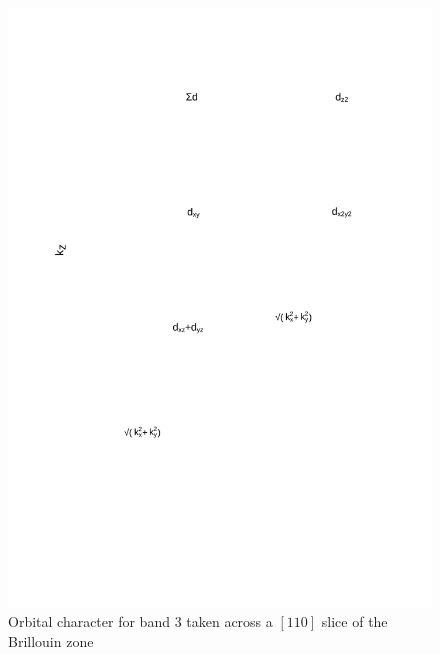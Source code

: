\begin{figure}[h!]
    \begin{center}
        \includegraphics[scale=0.7]{Chapter3-dHvABaFe2P2/Figures/AngleDepMeasurements/BandCharacterPlot/Band3_110Slice_BandCharacter}
        \caption{Orbital character for band 3 taken across a $[110]$ slice of the Brillouin zone}
        \label{Fig:Appendix:BandCharacter110Band3}
    \end{center}
\end{figure}
